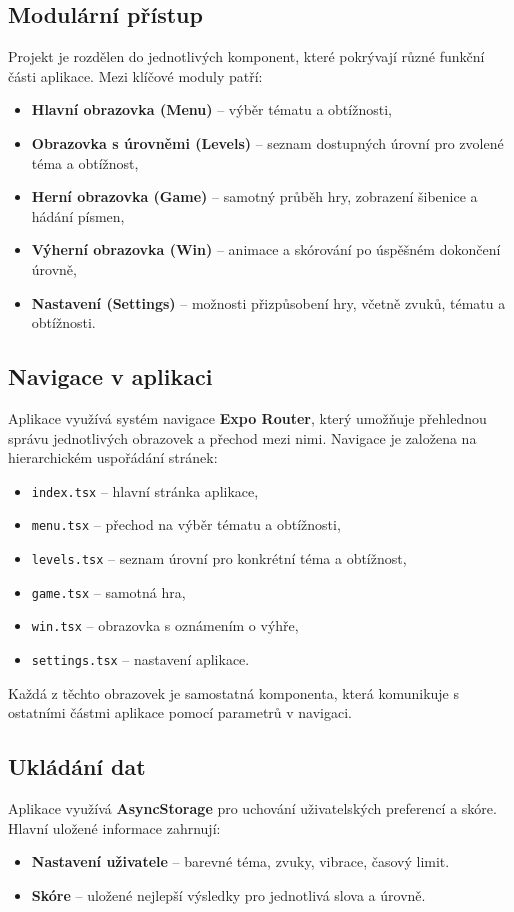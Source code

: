 \documentclass[a4paper,12pt]{article}
\begin{document}
\subsection{Modulární přístup}
Projekt je rozdělen do jednotlivých komponent, které pokrývají různé funkční části aplikace. Mezi klíčové moduly patří:
\begin{itemize}
    \item \textbf{Hlavní obrazovka (Menu)} – výběr tématu a obtížnosti,
    \item \textbf{Obrazovka s úrovněmi (Levels)} – seznam dostupných úrovní pro zvolené téma a obtížnost,
    \item \textbf{Herní obrazovka (Game)} – samotný průběh hry, zobrazení šibenice a hádání písmen,
    \item \textbf{Výherní obrazovka (Win)} – animace a skórování po úspěšném dokončení úrovně,
    \item \textbf{Nastavení (Settings)} – možnosti přizpůsobení hry, včetně zvuků, tématu a obtížnosti.
\end{itemize}

\subsection{Navigace v aplikaci}
Aplikace využívá systém navigace \textbf{Expo Router}, který umožňuje přehlednou správu jednotlivých obrazovek a přechod mezi nimi. Navigace je založena na hierarchickém uspořádání stránek:

\begin{itemize}
    \item \texttt{index.tsx} – hlavní stránka aplikace,
    \item \texttt{menu.tsx} – přechod na výběr tématu a obtížnosti,
    \item \texttt{levels.tsx} – seznam úrovní pro konkrétní téma a obtížnost,
    \item \texttt{game.tsx} – samotná hra,
    \item \texttt{win.tsx} – obrazovka s oznámením o výhře,
    \item \texttt{settings.tsx} – nastavení aplikace.
\end{itemize}

Každá z těchto obrazovek je samostatná komponenta, která komunikuje s ostatními částmi aplikace pomocí parametrů v navigaci.

\subsection{Ukládání dat}
Aplikace využívá \textbf{AsyncStorage} pro uchování uživatelských preferencí a skóre. Hlavní uložené informace zahrnují:
\begin{itemize}
    \item \textbf{Nastavení uživatele} – barevné téma, zvuky, vibrace, časový limit.
    \item \textbf{Skóre} – uložené nejlepší výsledky pro jednotlivá slova a úrovně.
\end{itemize}
\end{document}
